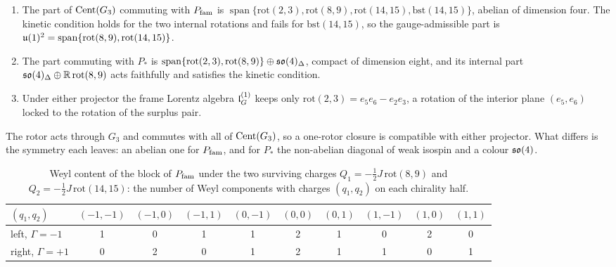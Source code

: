 \begin{theorem}
\label{thm:survive}
\begin{enumerate}[label=(\roman*),leftmargin=2.2em]
\item The part of $\operatorname{Cent}(G_3)$ commuting with $P_{\rm fam}$ is $\operatorname{span}\{\mathrm{rot}(2,3),\mathrm{rot}(8,9),\mathrm{rot}(14,15),\mathrm{bst}(14,15)\}$,
abelian of dimension four. The kinetic condition holds for the two internal rotations and fails for $\mathrm{bst}(14,15)$, so the gauge-admissible
part is $\mathfrak{u}(1)^2=\operatorname{span}\{\mathrm{rot}(8,9),\mathrm{rot}(14,15)\}$.
\item The part commuting with $P_*$ is $\operatorname{span}\{\mathrm{rot}(2,3),\mathrm{rot}(8,9)\}\oplus\mathfrak{so}(4)_\Delta$, compact of dimension eight, and its
internal part $\mathfrak{so}(4)_\Delta\oplus\mathbb{R}\,\mathrm{rot}(8,9)$ acts faithfully and satisfies the kinetic condition.
\item Under either projector the frame Lorentz algebra $\mathfrak l_G^{(1)}$ keeps only $\mathrm{rot}(2,3)=e_5e_6-e_2e_3$, a rotation of the interior plane
$(e_5,e_6)$ locked to the rotation of the surplus pair.
\end{enumerate}
\end{theorem}

The rotor acts through $G_3$ and commutes with all of $\operatorname{Cent}(G_3)$, so a one-rotor closure is compatible with either projector. What differs is the
symmetry each leaves: an abelian one for $P_{\rm fam}$, and for $P_*$ the non-abelian diagonal of weak isospin and a colour $\mathfrak{so}(4)$.

\begin{table}[t]
\centering
\small
\begin{tabular}{@{}lccccccccc@{}}
\toprule
$(q_1,q_2)$ & $(-1,-1)$ & $(-1,0)$ & $(-1,1)$ & $(0,-1)$ & $(0,0)$ & $(0,1)$ & $(1,-1)$ & $(1,0)$ & $(1,1)$\\
\midrule
left, $\Gamma=-1$ & 1 & 0 & 1 & 1 & 2 & 1 & 0 & 2 & 0\\
right, $\Gamma=+1$ & 0 & 2 & 0 & 1 & 2 & 1 & 1 & 0 & 1\\
\bottomrule
\end{tabular}
\caption{Weyl content of the block of $P_{\rm fam}$ under the two surviving charges $Q_1=-\tfrac12J\,\mathrm{rot}(8,9)$ and $Q_2=-\tfrac12J\,\mathrm{rot}(14,15)$:
the number of Weyl components with charges $(q_1,q_2)$ on each chirality half.}
\label{tab:closurecontent}
\end{table}

